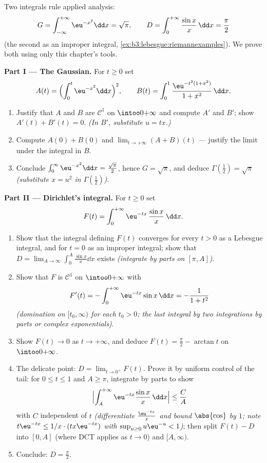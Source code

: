 \begin{problem}
\label{pb:b3:lebesgue:1}
Two integrals rule applied analysis:
\[
G = \int_{-\infty}^{+\infty}\eu^{-x^2}\dd x = \sqrt\pi,
\qquad
D = \int_0^{+\infty}\frac{\sin x}{x}\,\dd x = \frac\pi2
\]
(the second as an improper integral,
\cref{ex:b3:lebesgue:riemannexamples}). We prove both using
only this chapter's tools.

\medskip
\noindent\textbf{Part I --- The Gaussian.} For $t \geq 0$ set
\[
A(t) = \Bigl(\int_0^t\eu^{-x^2}\dd x\Bigr)^{2},
\qquad
B(t) = \int_0^1\frac{\eu^{-t^2(1 + x^2)}}{1 + x^2}\,\dd x .
\]
\begin{enumerate}
  \item Justify that $A$ and $B$ are $\mathcal C^1$ on
        $\intoo0{+\infty}$ and compute $A'$ and $B'$; show
        $A'(t) + B'(t) = 0$. \emph{(In $B'$, substitute $u =
        tx$.)}
  \item Compute $A(0) + B(0)$ and $\lim_{t\to+\infty}(A + B)(t)$
        --- justify the limit under the integral in $B$.
  \item Conclude $\int_0^\infty \eu^{-x^2}\dd x =
        \frac{\sqrt\pi}2$, hence $G = \sqrt\pi$, and deduce
        $\Gamma(\tfrac12) = \sqrt\pi$ \emph{(substitute $x =
        u^2$ in $\Gamma(\frac12)$)}.
\end{enumerate}

\medskip
\noindent\textbf{Part II --- Dirichlet's integral.} For $t
\geq 0$ set
\[
F(t) = \int_0^{+\infty}\eu^{-tx}\,\frac{\sin x}{x}\,\dd x .
\]
\begin{enumerate}[resume]
  \item Show that the integral defining $F(t)$ converges for
        every $t > 0$ as a Lebesgue integral, and for $t = 0$
        as an improper integral; show that $D =
        \lim_{A\to\infty}\int_0^A\frac{\sin x}x\dd x$ exists
        \emph{(integrate by parts on $[\pi, A]$)}.
  \item Show that $F$ is $\mathcal C^1$ on
        $\intoo0{+\infty}$ with
        \[
        F'(t) = -\int_0^{+\infty}\eu^{-tx}\sin x\,\dd x
        = -\frac{1}{1 + t^2}
        \]
        \emph{(domination on $[t_0, \infty)$ for each $t_0 >
        0$; the last integral by two integrations by parts or
        complex exponentials)}.
  \item Show $F(t) \to 0$ as $t \to +\infty$, and deduce $F(t)
        = \frac\pi2 - \arctan t$ on $\intoo0{+\infty}$.
  \item The delicate point: $D = \lim_{t\to0^+}F(t)$. Prove it
        by uniform control of the tail: for $0 \leq t \leq 1$
        and $A \geq \pi$, integrate by parts to show
        \[
        \Bigl|\int_A^{+\infty}\eu^{-tx}\frac{\sin
        x}x\,\dd x\Bigr| \leq \frac{C}{A}
        \]
        with $C$ independent of $t$ \emph{(differentiate
        $\frac{\eu^{-tx}}x$ and bound $\abs{\cos}$ by $1$;
        note $t\eu^{-tx} \leq 1/x\cdot(tx\eu^{-tx})$ with
        $\sup_{u\geq0}u\eu^{-u} < 1$)}; then split $F(t) - D$
        into $[0, A]$ (where DCT applies as $t \to 0$) and
        $[A, \infty)$.
  \item Conclude: $D = \frac\pi2$.
\end{enumerate}


\end{problem}
